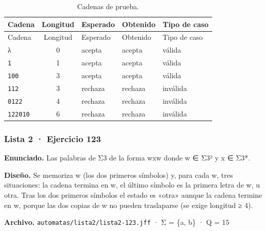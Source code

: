 \begin{longtable}[]{@{}lclll@{}}
\caption{Cadenas de prueba.}\tabularnewline
\toprule\noalign{}
Cadena & Longitud & Esperado & Obtenido & Tipo de caso \\
\midrule\noalign{}
\endfirsthead
\toprule\noalign{}
Cadena & Longitud & Esperado & Obtenido & Tipo de caso \\
\midrule\noalign{}
\endhead
\bottomrule\noalign{}
\endlastfoot
λ & 0 & acepta & acepta & válida \\
\texttt{1} & 1 & acepta & acepta & válida \\
\texttt{100} & 3 & acepta & acepta & válida \\
\texttt{112} & 3 & rechaza & rechaza & inválida \\
\texttt{0122} & 4 & rechaza & rechaza & inválida \\
\texttt{122010} & 6 & rechaza & rechaza & inválida \\
\end{longtable}


\hypertarget{lista-2-ejercicio-123}{%
\subsubsection{Lista 2 · Ejercicio 123}\label{lista-2-ejercicio-123}}

\textbf{Enunciado.} Las palabras de Σ3 de la forma wxw donde w ∈ Σ3² y x ∈ Σ3*.

\textbf{Diseño.} Se memoriza w (los dos primeros símbolos) y, para cada w, tres situaciones: la cadena termina en w, el último símbolo es la primera letra de w, u otra. Tras los dos primeros símbolos el estado es «otra» aunque la cadena termine en w, porque las dos copias de w no pueden traslaparse (se exige longitud ≥ 4).

\textbf{Archivo.} \texttt{automatas/lista2/lista2-123.jff} · Σ = \{a, b\} · \textbar Q\textbar{} = 15

